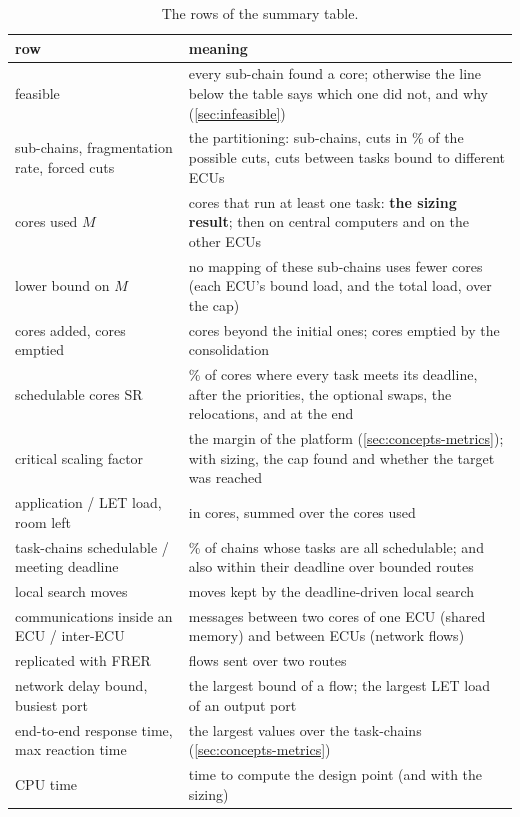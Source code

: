 \begin{table}[h]
\centering\small\row
\caption{The rows of the summary table.}
\label{tab:summary-rows}
\begin{tabularx}{\textwidth}{@{}>{\raggedright\arraybackslash}p{50mm}X@{}}
\toprule\rowcolor{white}
row & meaning \\
\midrule
feasible & every sub-chain found a core; otherwise the line below the table says which one did not, and why (\cref{sec:infeasible}) \\
sub-chains, fragmentation rate, forced cuts & the partitioning: sub-chains, cuts in \% of the possible cuts, cuts between tasks bound to different ECUs \\
cores used $M$ & cores that run at least one task: \textbf{the sizing result}; then on central computers and on the other ECUs \\
lower bound on $M$ & no mapping of these sub-chains uses fewer cores (each ECU's bound load, and the total load, over the cap) \\
cores added, cores emptied & cores beyond the initial ones; cores emptied by the consolidation \\
schedulable cores SR & \% of cores where every task meets its deadline, after the priorities, the optional swaps, the relocations, and at the end \\
critical scaling factor & the margin of the platform (\cref{sec:concepts-metrics}); with sizing, the cap found and whether the target was reached \\
application / LET load, room left & in cores, summed over the cores used \\
task-chains schedulable / meeting deadline & \% of chains whose tasks are all schedulable; and also within their deadline over bounded routes \\
local search moves & moves kept by the deadline-driven local search \\
communications inside an ECU / inter-ECU & messages between two cores of one ECU (shared memory) and between ECUs (network flows) \\
replicated with FRER & flows sent over two routes \\
network delay bound, busiest port & the largest bound of a flow; the largest LET load of an output port \\
end-to-end response time, max reaction time & the largest values over the task-chains (\cref{sec:concepts-metrics}) \\
CPU time & time to compute the design point (and with the sizing) \\
\bottomrule
\end{tabularx}
\end{table}


